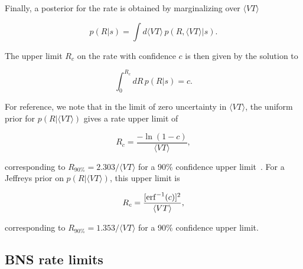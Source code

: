 Finally, a posterior for the rate is obtained by marginalizing over $\langle VT \rangle$
%
\begin{linenomath*}
\begin{equation}
p(R | s) = \int d\langle VT \rangle\, p(R, \langle VT \rangle | s).
\label{eq:posterior}
\end{equation}
\end{linenomath*}
%
The upper limit $R_c$ on the rate with confidence $c$ is then given by the solution to
%
\begin{linenomath*}
\begin{equation}
\label{eq:upperlimit}
\int_0^{R_c} dR\, p(R | s) = c.
\end{equation}
\end{linenomath*}

For reference, we note that in the limit of zero uncertainty in $\langle VT \rangle$,
the uniform prior for $p(R | \langle VT \rangle)$ gives a rate upper limit of
%
\begin{linenomath*}
\begin{equation}
R_c = \frac{ -\ln(1-c) }{ \langle VT \rangle },
\end{equation}
\end{linenomath*}
%
corresponding to $R_{90\%} = 2.303/\langle VT \rangle$ for a 90\% confidence upper
limit~\citep{Biswas:2007ni}. For a Jeffreys prior on $p(R | \langle VT \rangle)$, this upper limit is
%
\begin{linenomath*}
\begin{equation}
R_c = \frac{ [{\rm erf}^{-1}(c)]^2 }{ \langle VT \rangle },
\end{equation}
\end{linenomath*}
%
corresponding to $R_{90\%} = 1.353/\langle VT \rangle$ for a 90\% confidence upper limit.


\subsection{BNS rate limits}
\label{ssec:bns_rate_limits}

